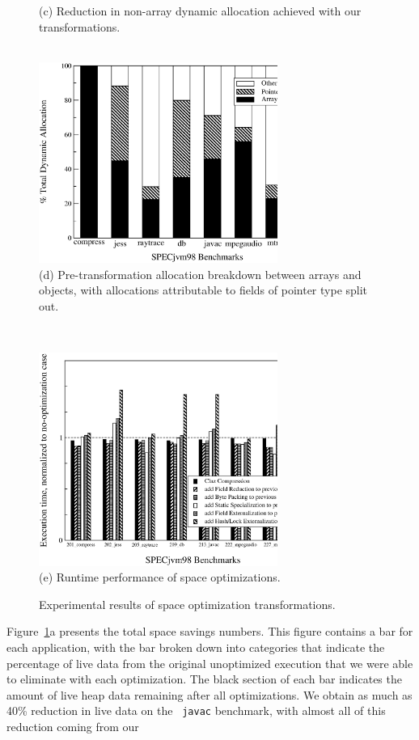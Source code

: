 \documentclass{acmconf}
\begin{document}
\begin{figure}
\begin{center}
{(c) Reduction in non-array dynamic allocation achieved with
    our transformations.
\\~}%
~~\parbox[b]{8cm}{\centering%
\includegraphics[width=7.8cm,clip=true]{Figures/sas-objarrptr.eps}\\
(d) Pre-transformation allocation breakdown between arrays and objects,
with allocations attributable to fields of pointer type split out.}%
\\[.3cm]
\parbox[b]{8cm}{\centering%
\includegraphics[width=7.8cm,clip=true]{Figures/oopsla-speed.eps}\\
(e) Runtime performance of space optimizations.}%
\end{center}
\caption{Experimental results of space optimization transformations.}
\label{fig:results}
\end{figure}
%
Figure~\ref{fig:results}a presents the total space savings numbers. This
figure contains a bar for each application, with the bar broken
down into categories that indicate the percentage of live data from 
the original unoptimized execution that we were able to eliminate
with each optimization. The black section of each bar indicates the
amount of live heap data remaining after all optimizations. 
We obtain as much as 40\% reduction in live data on the {\tt
  javac} benchmark, with almost all of this reduction coming from our
\end{document}
